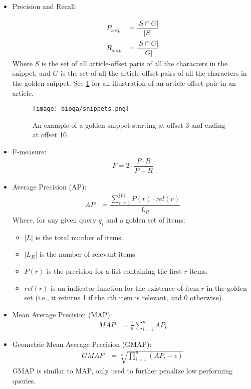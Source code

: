 \begin{itemize}
\item Precision and Recall:
\begin{comment}
\begin{align}
P &= \dfrac{TP}{TP + FP} \tag{where TP are true positives, and FP are false positives}\\
R &= \dfrac{TP}{TP + FN} \tag{where TP are true positives, and FN are false negatives}
\end{align}
\end{comment}

\begin{align}
P_{snip} &= \dfrac{|S \cap G|}{|S|}\\
R_{snip} &= \dfrac{|S \cap G|}{|G|}
\end{align}
Where $S$ is the set of all article-offset paris of all the characters in the snippet, and $G$ is the set of all the article-offset pairs of all the characters in the golden snippet. See \ref{fig:snippets} for an illustration of an article-offset pair in an article.

\begin{figure}
\centering
\texttt{[image: bioqa/snippets.png]}
\caption{An example of a golden snippet starting at offset 3 and ending at offset 10.}
\label{fig:snippets}
\end{figure}
\item F-measure:
\begin{align}
F = 2 \cdot \dfrac{P\cdot R}{P + R} \tag{Harmonic mean of Precision and Recall}
\end{align}
\item Average Precision (AP):
\begin{align}
AP &= \dfrac{\sum^{|L|}_{r=1} P(r) \cdot rel(r)}{L_R} \tag{see below}
\end{align} 
Where, for any given query $q_i$ and a golden set of items:
\begin{itemize}
\item $|L|$ is the total number of items.
\item $|L_R|$ is the number of relevant items. 
\item $P(r)$ is the precision for a list containing the first $r$ items.
\item $rel(r)$ is an indicator function for the existence of item $r$ in the golden set (i.e., it returns 1 if the $r$th item is relevant, and 0 otherwise).
\end{itemize}
\item Mean Average Precision (MAP):
\begin{align}
MAP &= \frac{1}{n} \sum^n_{i=1}AP_i  \tag{To get the average precision for list of queries $q_1, q_2, \dots, q_n$.}
\end{align}
\item Geometric Mean Average Precision (GMAP):
\begin{align}
GMAP &= \sqrt[n]{\prod^n_{i=1}(AP_i + \epsilon)} \tag{with some small $\epsilon$ for cases where $AP_i=0$}
\end{align}
GMAP is similar to MAP, only used to further penalize low performing queries.
\end{itemize}

